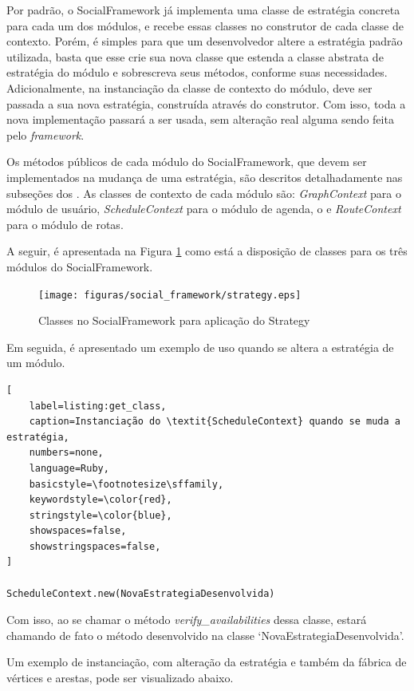 Por padrão, o SocialFramework já implementa uma classe de estratégia concreta para cada um dos módulos, e recebe essas classes no construtor de cada classe de contexto. Porém, é simples para que um desenvolvedor altere a estratégia padrão utilizada, basta que esse crie sua nova classe que estenda a classe abstrata de estratégia do módulo e sobrescreva seus métodos, conforme suas necessidades. Adicionalmente, na instanciação da classe de contexto do módulo, deve ser passada a sua nova estratégia, construída através do construtor. Com isso, toda a nova implementação passará a ser usada, sem alteração real alguma sendo feita pelo \textit{framework}.

Os métodos públicos de cada módulo do SocialFramework, que devem ser implementados na mudança de uma estratégia, são descritos detalhadamente nas subseções dos . As classes de contexto de cada módulo são: \textit{GraphContext} para o módulo de usuário, \textit{ScheduleContext} para o módulo de agenda, o e \textit{RouteContext} para o módulo de rotas.

A seguir, é apresentada na Figura \ref{padrao_strategy} como está a disposição de classes para os três módulos do SocialFramework.

\begin{figure}[h]
    \centering
    \texttt{[image: figuras/social\_framework/strategy.eps]}
    \caption{Classes no SocialFramework para aplicação do Strategy}
    \label{padrao_strategy}
\end{figure}

Em seguida, é apresentado um exemplo de uso quando se altera a estratégia de um módulo.

\begin{lstlisting}[
    label=listing:get_class,
    caption=Instanciação do \textit{ScheduleContext} quando se muda a estratégia,
    numbers=none,
    language=Ruby,
    basicstyle=\footnotesize\sffamily,
    keywordstyle=\color{red},
    stringstyle=\color{blue},
    showspaces=false,
    showstringspaces=false,
]

ScheduleContext.new(NovaEstrategiaDesenvolvida)
\end{lstlisting}

Com isso, ao se chamar o método \textit{verify\_availabilities} dessa classe, estará chamando de fato o método desenvolvido na classe `NovaEstrategiaDesenvolvida'.

Um exemplo de instanciação, com alteração da estratégia e também da fábrica de vértices e arestas, pode ser visualizado abaixo.

